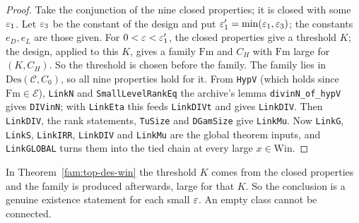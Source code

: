 \begin{proof}
Take the conjunction of the nine closed properties; it is closed with some $\varepsilon_1$. Let $\varepsilon_3$ be the constant of the design and put $\varepsilon_1'=\min(\varepsilon_1,\varepsilon_3)$; the constants $e_D,e_L$ are those given. For $0<\varepsilon<\varepsilon_1'$, the closed properties give a threshold $K$; the design, applied to this $K$, gives a family $\mathrm{Fm}$ and $C_H$ with $\mathrm{Fm}$ large for $(K,C_H)$. So the threshold is chosen before the family. The family lies in $\mathrm{Des}(\mathcal C,C_0)$, so all nine properties hold for it. From \texttt{HypV} (which holds since $\mathrm{Fm}\in\mathcal E$), \texttt{LinkN} and \texttt{SmallLevelRankEq} the archive's lemma \texttt{divinN\_of\_hypV} gives \texttt{DIVinN}; with \texttt{LinkEta} this feeds \texttt{LinkDIVt} and gives \texttt{LinkDIV}. Then \texttt{LinkDIV}, the rank statements, \texttt{TuSize} and \texttt{DGamSize} give \texttt{LinkMu}. Now \texttt{LinkG}, \texttt{LinkS}, \texttt{LinkIRR}, \texttt{LinkDIV} and \texttt{LinkMu} are the global theorem inputs, and \texttt{LinkGLOBAL} turns them into the tied chain at every large $x\in\mathrm{Win}$.
\end{proof}

\begin{remark}\label{fam:rem-quantifiers}
In Theorem~\ref{fam:top-des-win} the threshold $K$ comes from the closed properties and the family is produced afterwards, large for that $K$. So the conclusion is a genuine existence statement for each small $\varepsilon$. An empty class cannot be connected.
\end{remark}

